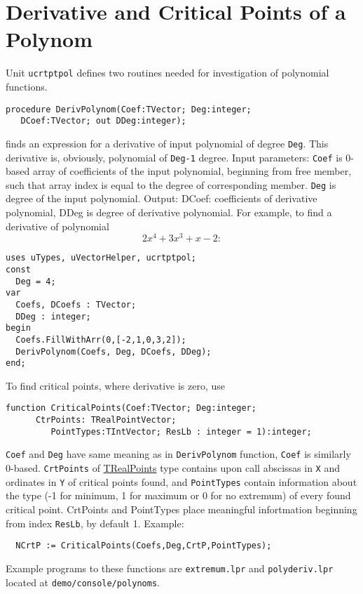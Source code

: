 \documentclass[12pt,a4paper,oneside]{article}
\newcommand{\code}[1]{\texttt{#1}}
\begin{document}
\section{Derivative and Critical Points of a Polynom}
Unit \code{ucrtptpol} defines two routines needed for investigation of polynomial functions.
\begin{verbatim}
procedure DerivPolynom(Coef:TVector; Deg:integer;
   DCoef:TVector; out DDeg:integer);
\end{verbatim}\vspace{-6pt}
finds an expression for a derivative of input polynomial of degree \code{Deg}. This derivative is, obviously, polynomial of \code{Deg-1} degree. Input parameters: \code{Coef} is 0-based array of coefficients of the input polynomial, beginning from free member, such that array index is equal to the degree of corresponding member. \code{Deg} is degree of the input polynomial. Output: DCoef: coefficients of derivative polynomial, DDeg is degree of derivative polynomial. For example, to find a derivative of polynomial
$$2x^4+3x^3+x-2:$$
\begin{verbatim}
uses uTypes, uVectorHelper, ucrtptpol;
const
  Deg = 4; 
var
  Coefs, DCoefs : TVector; 
  DDeg : integer;  
begin
  Coefs.FillWithArr(0,[-2,1,0,3,2]);
  DerivPolynom(Coefs, Deg, DCoefs, DDeg);
end;
\end{verbatim}
To find critical points, where derivative is zero, use \vspace{-6pt}
\begin{verbatim}
function CriticalPoints(Coef:TVector; Deg:integer; 
      CtrPoints: TRealPointVector; 
         PointTypes:TIntVector; ResLb : integer = 1):integer;
\end{verbatim}
\code{Coef} and \code{Deg} have same meaning as in \code{DerivPolynom} function, \code{Coef} is similarly 0-based. \code{CrtPoints} of \hyperref[sec:trealpoint]{TRealPoints} type contains upon call  abscissas in \code{X} and ordinates in \code{Y} of critical points found, and \code{PointTypes} contain information about the type (-1 for minimum, 1 for maximum or 0 for no extremum) of every found critical point. CrtPoints and PointTypes place meaningful infortmation beginning from index \code{ResLb}, by default 1. 
Example:
\begin{verbatim}
  NCrtP := CriticalPoints(Coefs,Deg,CrtP,PointTypes);
\end{verbatim}
Example programs to these functions are \code{extremum.lpr} and \code{polyderiv.lpr} located at \code{demo/console/polynoms}. 
\end{document}
